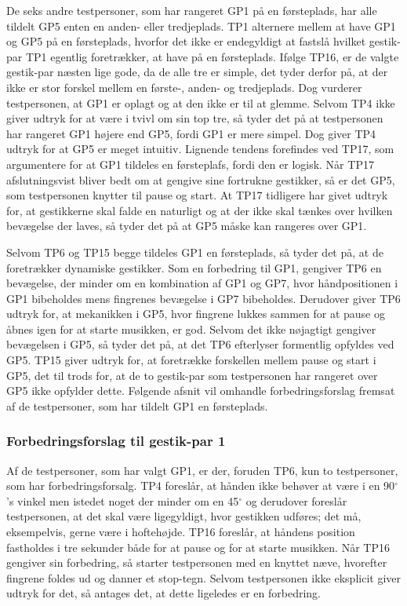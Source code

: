 De seks andre testpersoner, som har rangeret GP1 på en førsteplads, har alle tildelt GP5 enten en anden- eller tredjeplads. TP1 alternere mellem at have GP1 og GP5 på en førsteplads, hvorfor det ikke er endegyldigt at fastslå hvilket gestik-par TP1 egentlig foretrækker, at have på en førsteplads. Ifølge TP16, er de valgte gestik-par næsten lige gode, da de alle tre er simple, det tyder derfor på, at der ikke er stor forskel mellem en første-, anden- og tredjeplads. Dog vurderer testpersonen, at GP1 er oplagt og at den ikke er til at glemme. Selvom TP4 ikke giver udtryk for at være i tvivl om sin top tre, så tyder det på at testpersonen har rangeret GP1 højere end GP5, fordi GP1 er mere simpel. Dog giver TP4 udtryk for at GP5 er meget intuitiv. Lignende tendens forefindes ved TP17, som argumentere for at GP1 tildeles en førsteplafs, fordi den er logisk. Når TP17 afslutningsvist bliver bedt om at gengive sine fortrukne gestikker, så er det GP5, som testpersonen knytter til pause og start. At TP17 tidligere har givet udtryk for, at gestikkerne skal falde en naturligt og at der ikke skal tænkes over hvilken bevægelse der laves, så tyder det på at GP5 måske kan rangeres over GP1.

Selvom TP6 og TP15 begge tildeles GP1 en førsteplads, så tyder det på, at de foretrækker dynamiske gestikker. Som en forbedring til GP1, gengiver TP6 en bevægelse, der minder om en kombination af GP1 og GP7, hvor håndpositionen i GP1 bibeholdes mens fingrenes bevægelse i GP7 bibeholdes. Derudover giver TP6 udtryk for, at mekanikken i GP5, hvor fingrene lukkes sammen for at pause og åbnes igen for at starte musikken, er god. Selvom det ikke nøjagtigt gengiver bevægelsen i GP5, så tyder det på, at det TP6 efterlyser formentlig opfyldes ved GP5. TP15 giver udtryk for, at foretrække forskellen mellem pause og start i GP5, det til trods for, at de to gestik-par som testpersonen har rangeret over GP5 ikke opfylder dette.\blankline
%
Følgende afsnit vil omhandle forbedringsforslag fremsat af de testpersoner, som har tildelt GP1 en førsteplads.
%
\subsubsection{Forbedringsforslag til gestik-par 1}
\label{TestresultaterValgAfGestikkerForbedringGP1}
%
Af de testpersoner, som har valgt GP1, er der, foruden TP6, kun to testpersoner, som har forbedringsforsalg. TP4 foreslår, at hånden ikke behøver at være i en 90$^{\circ}$'s vinkel men istedet noget der minder om en 45$^{\circ}$ og derudover foreslår testpersonen, at det skal være ligegyldigt, hvor gestikken udføres; det må, eksempelvis, gerne være i hoftehøjde. TP16 foreslår, at håndens position fastholdes i tre sekunder både for at pause og for at starte musikken. Når TP16 gengiver sin forbedring, så starter testpersonen med en knyttet næve, hvorefter fingrene foldes ud og danner et stop-tegn. Selvom testpersonen ikke eksplicit giver udtryk for det, så antages det, at dette ligeledes er en forbedring.
%

